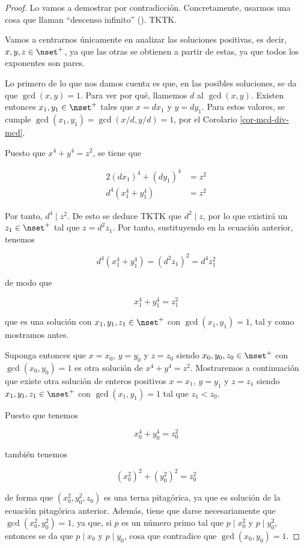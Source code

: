 \begin{proof}
  Lo vamos a demostrar por contradicción. Concretamente, usarmos una cosa
  que llaman ``descenso infinito'' (). TKTK.

  Vamos a centrarnos únicamente en analizar las soluciones positivas, es
  decir, $x, y, z \in \nset^{+}$, ya que las otras se obtienen a partir de
  estas, ya que todos los exponentes son pares.

  Lo primero de lo que nos damos cuenta es que, en las posibles soluciones,
  se da que $\gcd(x, y) = 1$. Para ver por qué, llamemos $d$ al $\gcd(x,
  y)$. Existen entonces $x_1, y_1 \in \nset^{+}$ tales que $x = dx_1$ y $y =
  dy_1$. Para estos valores, se cumple $\gcd(x_1, y_1) = \gcd(x/d, y/d) =
  1$, por el Corolario \ref{cor-mcd-div-mcd}.

  Puesto que $x^4 + y^4 = z^2$, se tiene que

  \begin{alignat*}{2}
    (dx_1)^4 + (dy_1)^4 &= z^2 \\
    d^4(x_1^4 + y_1^4)  &= z^2
  \end{alignat*}

  \noindent Por tanto, $d^4 \mid z^2$. De esto se deduce TKTK que $d^2 \mid
  z$, por lo que existirá un $z_1 \in \nset^{+}$ tal que $z = d^2 z_1$. Por
  tanto, sustituyendo en la ecuación anterior, tenemos

  $$ d^4(x_1^4 + y_1^4) = (d^2 z_1)^2 = d^4 z_1^2 $$

  \noindent de modo que

  $$ x_1^4 + y_1^4 = z_1^2 $$

  \noindent que es una solución con $x_1, y_1, z_1 \in \nset^{+}$ con
  $\gcd(x_1, y_1) = 1$, tal y como mostramos antes.

  Suponga entonces que $x = x_0$, $y = y_0$ y $z = z_0$ siendo $x_0, y_0,
  z_0 \in \nset^{+}$ con $\gcd(x_0, y_0) = 1$ es otra solución de $x^4 + y^4
  = z^2$. Mostraremos a continuación que existe otra solución de enteros
  positivos $x = x_1$, $y = y_1$ y $z = z_1$ siendo $x_1, y_1, z_1 \in
  \nset^{+}$ con $\gcd(x_1, y_1) = 1$ tal que $z_1 < z_0$.

  Puesto que tenemos

  $$ x_0^4 + y_0^4 = z_0^2 $$

  \noindent también tenemos

  $$ (x_0^2)^2 + (y_0^2)^2 = z_0^2$$

  \noindent de forma que $(x_0^2, y_0^2, z_0)$ es una terna pitagórica, ya
  que es solución de la ecuación pitagórica anterior. Además, tiene que
  darse necesariamente que $\gcd(x_0^2, y_0^2) = 1$, ya que, si $p$ es un
  número primo tal que $p \mid x_0^2$ y $p \mid y_0^2$, entonces se da que
  $p \mid x_0$ y $p \mid y_0$, cosa que contradice que $\gcd(x_0, y_0) = 1$.

  

















\end{proof}
